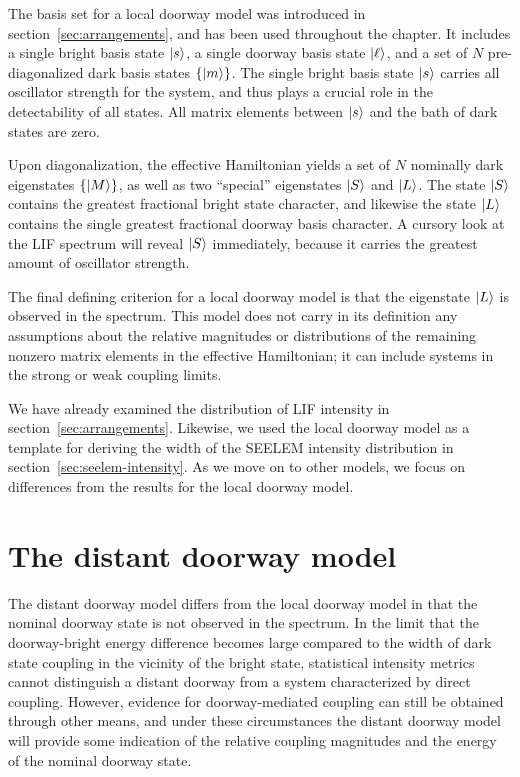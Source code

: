 The basis set for a local doorway model was introduced in
section~\ref{sec:arrangements}, and has been used throughout the
chapter. It includes a single bright basis state $\mathinner{|{s}\rangle}$, a single
doorway basis state $\mathinner{|{\ell}\rangle}$, and a set of $N$ pre-diagonalized
dark basis states $\lbrace \mathinner{|{m}\rangle} \rbrace$.  The single bright basis
state $\mathinner{|{s}\rangle}$ carries all oscillator strength for the system, and
thus plays a crucial role in the detectability of all states.  All
matrix elements between $\mathinner{|{s}\rangle}$ and the bath of dark states are
zero.

Upon diagonalization, the effective Hamiltonian yields a set of $N$
nominally dark eigenstates $\lbrace \mathinner{|{M}\rangle} \rbrace$, as well as two
``special'' eigenstates $\mathinner{|{S}\rangle}$ and $\mathinner{|{L}\rangle}$.  The state $\mathinner{|{S}\rangle}$
contains the greatest fractional bright state character, and likewise
the state $\mathinner{|{L}\rangle}$ contains the single greatest fractional doorway
basis character.  A cursory look at the LIF spectrum will reveal
$\mathinner{|{S}\rangle}$ immediately, because it carries the greatest amount of
oscillator strength.

The final defining criterion for a local doorway model is that the
eigenstate $\mathinner{|{L}\rangle}$ is observed in the spectrum.  This model does not
carry in its definition any assumptions about the relative magnitudes
or distributions of the remaining nonzero matrix elements in the
effective Hamiltonian; it can include systems in the strong or weak
coupling limits.

We have already examined the distribution of LIF intensity in
section~\ref{sec:arrangements}.  Likewise, we used the local doorway
model as a template for deriving the width of the SEELEM intensity
distribution in section~\ref{sec:seelem-intensity}.  As we move on to
other models, we focus on differences from the results for the local
doorway model.

%

\section{The distant doorway model}
\label{sec:model-distant}

The distant doorway model differs from the local doorway model in that
the nominal doorway state is not observed in the spectrum.  In the
limit that the doorway-bright energy difference becomes large compared
to the width of dark state coupling in the vicinity of the bright
state, statistical intensity metrics cannot distinguish a distant
doorway from a system characterized by direct coupling.  However,
evidence for doorway-mediated coupling can still be obtained through
other means, and under these circumstances the distant doorway model
will provide some indication of the relative coupling magnitudes and
the energy of the nominal doorway state.

